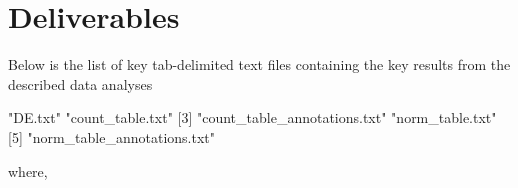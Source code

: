 \documentclass[12pt]{article}
\begin{document}


\section{Deliverables}
Below is the list of key tab-delimited text files containing the key results from the described data analyses
\begin{Schunk}
\begin{Soutput}
[1] "DE.txt"                      "count_table.txt"            
[3] "count_table_annotations.txt" "norm_table.txt"             
[5] "norm_table_annotations.txt" 
\end{Soutput}
\end{Schunk}
where, 
\end{document}
